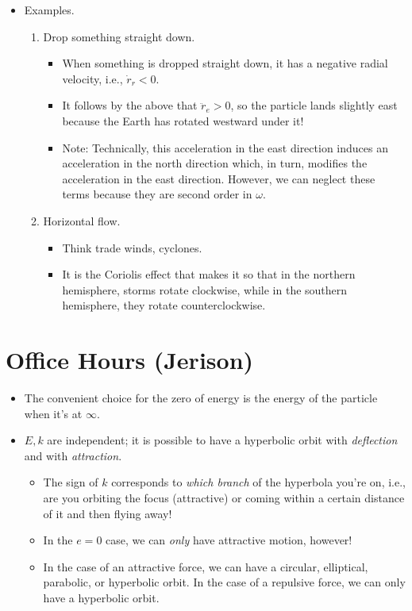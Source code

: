 \documentclass[../notes.tex]{subfiles}
\begin{document}
\begin{itemize}
\begin{itemize}
\begin{itemize}
        \end{itemize}
        \item Examples.
        \begin{enumerate}
            \item Drop something straight down.
            \begin{itemize}
                \item When something is dropped straight down, it has a negative radial velocity, i.e., $\dot{r}_r<0$.
                \item It follows by the above that $\ddot{r}_e>0$, so the particle lands slightly east because the Earth has rotated westward under it!
                \item Note: Technically, this acceleration in the east direction induces an acceleration in the north direction which, in turn, modifies the acceleration in the east direction. However, we can neglect these terms because they are second order in $\omega$.
            \end{itemize}
            \item Horizontal flow.
            \begin{itemize}
                \item Think trade winds, cyclones.
                \item It is the Coriolis effect that makes it so that in the northern hemisphere, storms rotate clockwise, while in the southern hemisphere, they rotate counterclockwise.
            \end{itemize}
        \end{enumerate}
    \end{itemize}
\end{itemize}



\section{Office Hours (Jerison)}
\begin{itemize}
    \item The convenient choice for the zero of energy is the energy of the particle when it's at $\infty$.
    \item $E,k$ are independent; it is possible to have a hyperbolic orbit with \emph{deflection} and with \emph{attraction}.
    \begin{itemize}
        \item The sign of $k$ corresponds to \emph{which branch} of the hyperbola you're on, i.e., are you orbiting the focus (attractive) or coming within a certain distance of it and then flying away!
        \item In the $e=0$ case, we can \emph{only} have attractive motion, however!
        \item In the case of an attractive force, we can have a circular, elliptical, parabolic, or hyperbolic orbit. In the case of a repulsive force, we can only have a hyperbolic orbit.
    \end{itemize}
\end{itemize}
\end{document}
